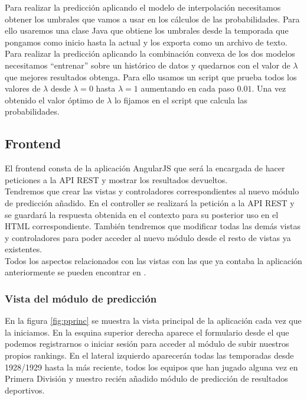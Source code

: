 Para realizar la predicción aplicando el modelo de interpolación necesitamos obtener los umbrales que vamos a usar en los cálculos de las probabilidades. Para ello usaremos una clase Java que obtiene los umbrales desde la temporada que pongamos como inicio hasta la actual y los exporta como un archivo de texto.\\

Para realizar la predicción aplicando la combinación convexa de los dos modelos necesitamos ``entrenar'' sobre un histórico de datos y quedarnos con el valor de $\lambda$ que mejores resultados obtenga. Para ello usamos un script que prueba todos los valores de $\lambda$ desde $\lambda=0$ hasta $\lambda=1$ aumentando en cada paso $0.01$. Una vez obtenido el valor óptimo de $\lambda$ lo fijamos en el script que calcula las probabilidades.  

\subsection{Frontend}
El frontend consta de la aplicación AngularJS que será la encargada de hacer peticiones a la API REST y mostrar los resultados devueltos.\\

Tendremos que crear las vistas y controladores correspondientes al nuevo módulo de predicción añadido. En el controller se realizará la petición a la API REST y se guardará la respuesta obtenida en el contexto para su posterior uso en el HTML correspondiente. También tendremos que modificar todas las demás vistas y controladores para poder acceder al nuevo módulo desde el resto de vistas ya existentes.\\

Todos los aspectos relacionados con las vistas con las que ya contaba la aplicación anteriormente se pueden encontrar en \cite[sección 3.4.1.]{tfgjose}.\\


\subsubsection{Vista del módulo de predicción}
En la figura \ref{fig:pprinc} se muestra la vista principal de la aplicación cada vez que la iniciamos. En la esquina superior derecha aparece el formulario desde el que podemos registrarnos o iniciar sesión para acceder al módulo de subir nuestros propios rankings. En el lateral izquierdo aparecerán todas las temporadas desde 1928/1929 hasta la más reciente, todos los equipos que han jugado alguna vez en Primera División y nuestro recién añadido módulo de predicción de resultados deportivos.\\

